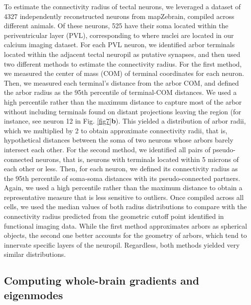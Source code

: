 \documentclass{article}
\begin{document}
To estimate the connectivity radius of tectal neurons, we leveraged a dataset of 4327 independently reconstructed neurons from mapZebrain, compiled across different animals\cite{kunst2019cellular}. Of these neurons, 525 have their soma located within the periventricular layer (PVL), corresponding to where nuclei are located in our calcium imaging dataset. For each PVL neuron, we identified arbor terminals located within the adjacent tectal neuropil as putative synapses, and then used two different methods to estimate the connectivity radius. For the first method, we measured the center of mass (COM) of terminal coordinates for each neuron. Then, we measured each terminal's distance from the arbor COM, and defined the arbor radius as the 95th percentile of terminal-COM distances. We used a high percentile rather than the maximum distance to capture most of the arbor without including terminals found on distant projections leaving the region (for instance, see neuron 12 in Fig. \ref{fig7}\textbf{b}). This yielded a distribution of arbor radii, which we multiplied by 2 to obtain approximate connectivity radii, that is, hypothetical distances between the soma of two neurons whose arbors barely intersect each other. For the second method, we identified all pairs of pseudo-connected neurons, that is, neurons with terminals located within 5 microns of each other or less. Then, for each neuron, we defined its connectivity radius as the 95th percentile of soma-soma distances with its pseudo-connected partners. Again, we used a high percentile rather than the maximum distance to obtain a representative measure that is less sensitive to outliers. Once compiled across all cells, we used the median values of both radius distributions to compare with the connectivity radius predicted from the geometric cutoff point identified in functional imaging data. While the first method approximates arbors as spherical objects, the second one better accounts for the geometry of arbors, which tend to innervate specific layers of the neuropil. Regardless, both methods yielded very similar distributions.

\subsection*{Computing whole-brain gradients and eigenmodes}
\end{document}

